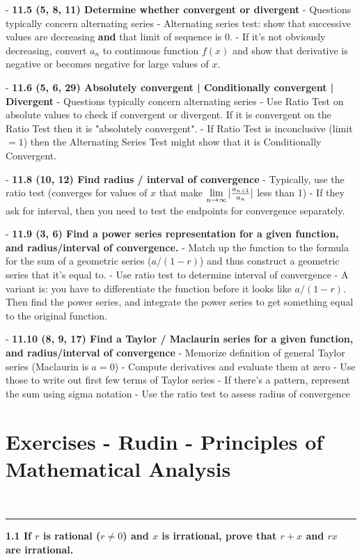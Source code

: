 - \textbf{11.5 (5, 8, 11) Determine whether convergent or divergent}
    - Questions typically concern alternating series
    - Alternating series test: show that successive values are decreasing \textbf{and} that limit of sequence is 0.
    - If it's not obviously decreasing, convert $a_n$ to continuous function $f(x)$ and show that derivative is negative or becomes negative for large values of $x$.

- \textbf{11.6 (5, 6, 29) Absolutely convergent | Conditionally convergent | Divergent}
    - Questions typically concern alternating series
    - Use Ratio Test on absolute values to check if convergent or divergent. If it is convergent on the Ratio Test then it is "absolutely convergent".
    - If Ratio Test is inconclusive (limit $= 1$) then the Alternating Series Test might show that it is Conditionally Convergent.

- \textbf{11.8 (10, 12) Find radius / interval of convergence}
    - Typically, use the ratio test (converges for values of $x$ that make $\lim\limits_{n \to \infty} |\frac{a_{n+1}}{a_n}|$ less than 1)
    - If they ask for interval, then you need to test the endpoints for convergence separately.

- \textbf{11.9 (3, 6) Find a power series representation for a given function, and radius/interval of convergence.}
    - Match up the function to the formula for the sum of a geometric series ($a/(1-r)$) and thus construct a geometric series that it's equal to.
    - Use ratio test to determine interval of convergence
    - A variant is: you have to differentiate the function before it looks like $a/(1-r)$. Then find the power series, and integrate the power series to get something equal to the original function.

- \textbf{11.10 (8, 9, 17) Find a Taylor / Maclaurin series for a given function, and radius/interval of convergence}
    - Memorize definition of general Taylor series (Maclaurin is $a=0$)
    - Compute derivatives and evaluate them at zero
    - Use those to write out first few terms of Taylor series
    - If there's a pattern, represent the sum using sigma notation
    - Use the ratio test to assess radius of convergence


\section{Exercises - Rudin - Principles of Mathematical Analysis}

~\\\hrule
\textbf{1.1 If $r$ is rational ($r \neq 0$) and $x$ is irrational, prove that $r + x$
and $rx$ are irrational.}

